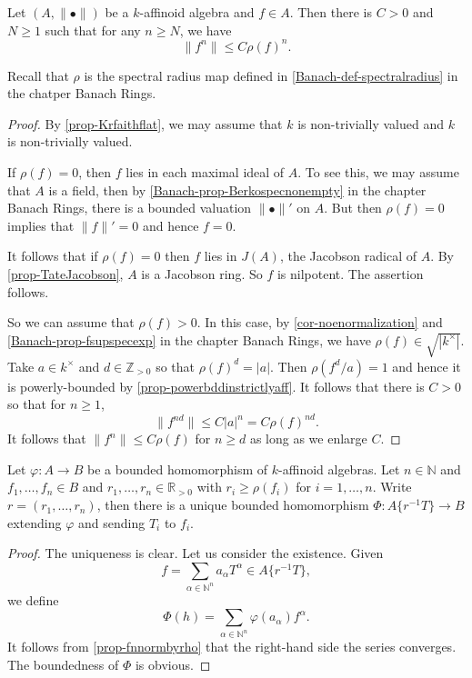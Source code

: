 \begin{proposition}\label{prop-fnnormbyrho}
    Let $(A,\|\bullet\|)$ be a $k$-affinoid algebra and $f\in A$. Then there is $C>0$ and $N\geq 1$ such that for any $n\geq N$, we have
    \[
        \|f^n\|\leq C\rho(f)^n.  
    \]
\end{proposition}
Recall that $\rho$ is the spectral radius map defined in \cref{Banach-def-spectralradius} in the chatper Banach Rings.
\begin{proof}
    By \cref{prop-Krfaithflat}, we may assume that $k$ is non-trivially valued and $k$ is non-trivially valued.
    
    If $\rho(f)=0$, then $f$ lies in each maximal ideal of $A$. To see this, we may assume that $A$ is a field, then by \cref{Banach-prop-Berkospecnonempty} in the chapter Banach Rings, there is a bounded valuation $\|\bullet\|'$ on $A$. But then $\rho(f)=0$ implies that $\|f\|'=0$ and hence $f=0$.

    It follows that if $\rho(f)=0$ then $f$ lies in $J(A)$, the Jacobson radical of $A$. By \cref{prop-TateJacobson}, $A$ is a Jacobson ring. So $f$ is nilpotent. The assertion follows.

    So we can assume that $\rho(f)>0$. In this case, by \cref{cor-noenormalization} and \cref{Banach-prop-fsupspecexp} in the chapter Banach Rings, we have $\rho(f)\in \sqrt{|k^{\times}|}$. Take $a\in k^{\times}$ and $d\in \mathbb{Z}_{>0}$ so that $\rho(f)^d=|a|$. Then $\rho(f^d/a)=1$ and hence it is powerly-bounded by \cref{prop-powerbddinstrictlyaff}. It follows that there is $C>0$ so that for $n\geq 1$, 
    \[
        \|f^{nd}\|\leq C |a|^n=C\rho(f)^{nd}. 
    \]
    It follows that $\|f^n\|\leq C\rho(f)$ for $n\geq d$ as long as we enlarge $C$.
\end{proof}


\begin{corollary}\label{cor-univpropTatenonstrict}
    Let $\varphi:A\rightarrow B$ be a bounded homomorphism of $k$-affinoid algebras. Let $n\in \mathbb{N}$ and  $f_1,\ldots,f_n\in B$ and $r_1,\ldots,r_n\in \mathbb{R}_{>0}$ with $r_i\geq \rho(f_i)$ for $i=1,\ldots,n$. Write $r=(r_1,\ldots,r_n)$, then there is a unique bounded homomorphism $\Phi:A\{r^{-1}T\}\rightarrow B$ extending $\varphi$ and sending $T_i$ to $f_i$.
\end{corollary}
\begin{proof}
    The uniqueness is clear. Let us consider the existence. Given 
    \[
        f=\sum_{\alpha\in \mathbb{N}^n} a_{\alpha}T^{\alpha}\in A\{r^{-1}T\}, 
    \]
    we define 
    \[
        \Phi(h)=\sum_{\alpha\in \mathbb{N}^n} \varphi(a_{\alpha})f^{\alpha}. 
    \]
    It follows from \cref{prop-fnnormbyrho} that the right-hand side the series converges. The boundedness of $\Phi$ is obvious.
\end{proof}


